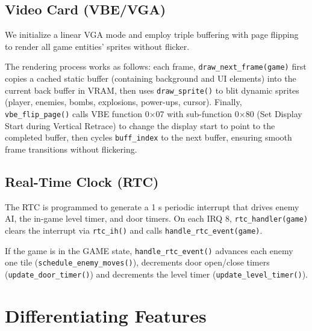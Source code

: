 \documentclass[12pt,a4paper]{article}
\begin{document}
\subsection{Video Card (VBE/VGA)}

We initialize a linear VGA mode and employ triple buffering with page flipping to render all game entities' sprites without flicker.

The rendering process works as follows: each frame, \texttt{draw\_next\_frame(game)} first copies a cached static buffer (containing background and UI elements) into the current back buffer in VRAM, then uses \texttt{draw\_sprite()} to blit dynamic sprites (player, enemies, bombs, explosions, power-ups, cursor). Finally, \texttt{vbe\_flip\_page()} calls VBE function 0$\times$07 with sub-function 0$\times$80 (Set Display Start during Vertical Retrace) to change the display start to point to the completed buffer, then cycles \texttt{buff\_index} to the next buffer, ensuring smooth frame transitions without flickering.

\subsection{Real-Time Clock (RTC)}

The RTC is programmed to generate a 1 s periodic interrupt that drives enemy AI, the in-game level timer, and door timers. On each IRQ 8, \texttt{rtc\_handler(game)} clears the interrupt via \texttt{rtc\_ih()} and calls \texttt{handle\_rtc\_event(game)}.

If the game is in the GAME state, \texttt{handle\_rtc\_event()} advances each enemy one tile (\texttt{schedule\_enemy\_moves()}), decrements door open/close timers (\texttt{update\_door\_timer()}) and decrements the level timer (\texttt{update\_level\_timer()}).

\section{Differentiating Features}
\end{document}

